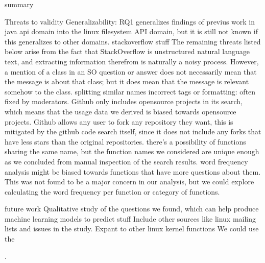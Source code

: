 
summary

Threats to validity
Generalizability:  RQ1 generalizes findings of previus work in java api domain into the linux filesystem API domain, but it is still not known if this generalizes to other domains.
stackoverflow stuff
The remaining threats listed below arise from the fact that StackOverflow is unstructured
natural language text, and extracting information therefrom is naturally a noisy
process.
However, a mention of a class in an SO question or answer does not necessarily mean
that the message is about that class; but it does mean that the message is relevant somehow
to the class.
splitting
similar names
incorrect tags or formatting: often fixed by moderators.
Github only includes opensource projects in its search, which means that the usage data we derived is biased towards opensource projects. Github allows any user to fork any repository they want, this is mitigated by the github code search itself, since it does not include any forks that have less stars than the original repositories. there's a possibility of functions sharing the same name, but the function names we considered are unique enough as we concluded from manual inspection of the search results.
word frequency analysis might be biased towards functions that have more questions about them. This was not found to be a major concern in our analysis, but we could explore calculating the word frequency per function or category of functions.

future work
Qualitative study of the questions we found,
which can help produce machine learning models to predict stuff
Include other sources like linux mailing lists and issues in the study.
Expant to other linux kernel functions
We could use the















.
